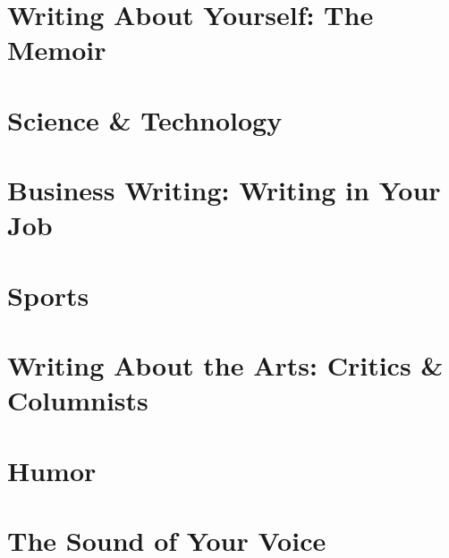 \documentclass{article}
\begin{document}

\section{Writing About Yourself: The Memoir}


\section{Science \& Technology}


\section{Business Writing: Writing in Your Job}


\section{Sports}


\section{Writing About the Arts: Critics \& Columnists}


\section{Humor}


\section{The Sound of Your Voice}

\end{document}
